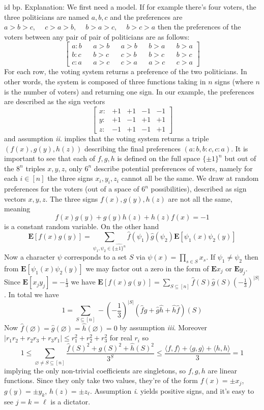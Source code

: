\documentclass[oneside]{book}
\renewcommand{\empty}{\varnothing}
\newcommand{\sub}{\subseteq}
\newcommand{\inner}[1]{\langle #1\rangle}
\newcommand{\E}{\mathbf{E}}
\newcommand{\set}[1]{\{ #1\}}
\newcommand{\fit}[1]{\left( #1\right)}
\newcommand{\abs}[1]{\left\lvert #1\right\rvert}
\newcommand{\spc}{\phantom{-}}
\renewcommand{\i}{{\it i}. }
\newcommand{\ii}{{\it ii}. }
\newcommand{\iii}{{\it iii}. }
\begin{document}
id bp. Explanation: We first need a model. If for example there's four voters, the three politicians are named $a,b,c$ and the preferences are
$a>b>c, \spc c>a>b, \spc b>a>c, \spc b>c>a$
then the preferences of the voters between any pair of pair of politicians are as follows:
$$\begin{bmatrix}
    a:b && a>b && a>b && b>a && b>a \\
b:c && b>c && c>b && b>c && b>c \\
c:a && a>c && c>a && a>c && c>a 
\end{bmatrix}$$
For each row, the voting system returns a preference of the two politicians. In other words, the system is composed of three functions taking in $n$ signs (where $n$ is the number of voters) and returning one sign. In our example, the preferences are described as the sign vectors
$$\begin{bmatrix}
x: & +1 & +1 & -1 & -1 \\
y: & +1 & -1 & +1 & +1 \\
z: & -1 & +1 & -1 & +1 
\end{bmatrix}  $$
and assumption \ii implies that the voting system returns a triple $(f(x),g(y),h(z))$ describing the final preferences $(a:b, b:c, c:a)$. It is important to see that each of $f,g,h$ is defined on the full space $\set{\pm1}^n$ but out of the $8^n$ triples $x,y,z$, only $6^n$ describe potential preferences of voters, namely for each $i\in[n]$ the three signs $x_i,y_i,z_i$ cannot all be the same. We draw at random preferences for the voters (out of a space of $6^n$ possibilities), described as sign vectors $x,y,z$. The three signs $f(x),g(y),h(z)$ are not all the same, meaning 
$$f(x)g(y)+g(y)h(z)+h(z)f(x)=-1$$
is a constant random variable. On the other hand
$$\E[f(x)g(y)]=\sum_{\psi_1,\psi_2\in\widehat{\set{\pm1}^n}}\hat{f}(\psi_1)\hat{g}(\psi_2)\E[\psi_1(x)\psi_2(y)]$$
Now a character $\psi$ corresponds to a set $S$ via $\psi(x)=\prod_{s\in S}x_s$. If $\psi_1\neq\psi_2$ then from $\E[\psi_1(x)\psi_2(y)]$ we may factor out a zero in the form of $\E x_j$ or $\E y_j$. Since $\E[x_jy_j]=-\frac{1}{3}$ we have  $\E[f(x)g(y)]=\sum_{S\sub[n]} \hat{f}(S)\hat{g}(S) \fit{-\frac{1}{3}}^{\abs{S}}$. In total we have
$$1 = \sum_{S\sub[n]}-\fit{-\frac{1}{3}}^{\abs{S}}\fit{\hat{f}\hat{g}+\hat{g}\hat{h}+\hat{h}\hat{f}}(S)$$
Now $\hat{f}(\empty)=\hat{g}(\empty)=\hat{h}(\empty)=0$ by assumption \iii Moreover $\abs{r_1r_2+r_2r_3+r_3r_1}\le r_1^2+r_2^2+r_3^2$ for real $r_i$ so 
$$1\le \sum_{\empty\neq S\sub[n]}\dfrac{\hat{f}(S)^2+\hat{g}(S)^2+\hat{h}(S)^2}{3^S}\le \dfrac{\inner{f,f}+\inner{g,g}+\inner{h,h}}{3}=1$$
implying the only non-trivial coefficients are singletons, so $f,g,h$ are linear functions. Since they only take two values, they're of the form $f(x)=\pm x_j$, $g(y)=\pm y_k$, $h(z)=\pm z_\ell$. Assumption \i yields positive signs, and it's easy to see $j=k=\ell$ is a dictator. \\\\
\end{document}
